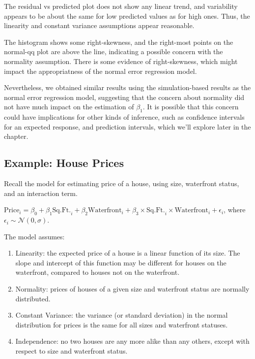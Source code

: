 \documentclass[
  letterpaper,
  DIV=11,
  numbers=noendperiod]{scrreprt}
\begin{document}
The residual vs predicted plot does not show any linear trend, and
variability appears to be about the same for low predicted values as for
high ones. Thus, the linearity and constant variance assumptions appear
reasonable.

The histogram shows some right-skewness, and the right-most points on
the normal-qq plot are above the line, indicating a possible concern
with the normality assumption. There is some evidence of right-skewness,
which might impact the appropriatness of the normal error regression
model.

Nevertheless, we obtained similar results using the simulation-based
results as the normal error regression model, suggesting that the
concern about normality did not have much impact on the estimation of
\(\beta_1\). It is possible that this concern could have implications
for other kinds of inference, such as confidence intervals for an
expected response, and prediction intervals, which we'll explore later
in the chapter.

\subsection{Example: House Prices}\label{example-house-prices}

Recall the model for estimating price of a house, using size, waterfront
status, and an interaction term.

\(\text{Price}_i = \beta_0 + \beta_1\text{Sq.Ft.}_{i}+ \beta_2\text{Waterfront}_{i}+ \beta_3\times\text{Sq.Ft.}_i\times\text{Waterfront}_{i} + \epsilon_i\),
where \(\epsilon_i\sim\mathcal{N}(0,\sigma)\).

The model assumes:

\begin{enumerate}
\def\labelenumi{\arabic{enumi}.}
\item
  Linearity: the expected price of a house is a linear function of its
  size. The slope and intercept of this function may be different for
  houses on the waterfront, compared to houses not on the waterfront.
\item
  Normality: prices of houses of a given size and waterfront status are
  normally distributed.
\item
  Constant Variance: the variance (or standard deviation) in the normal
  distribution for prices is the same for all sizes and waterfront
  statuses.
\item
  Independence: no two houses are any more alike than any others, except
  with respect to size and waterfront status.
\end{enumerate}
\end{document}
